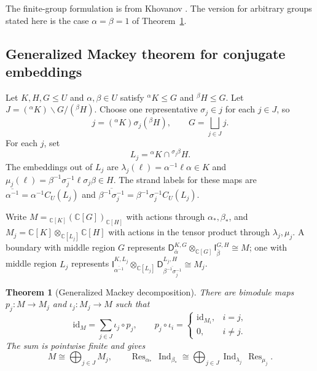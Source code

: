 \documentclass[11pt,a4paper]{article}
\numberwithin{equation}{section}
\newtheorem{theorem}{Theorem}[section]
\theoremstyle{definition}
\newcommand{\C}{\mathbb C}
\newcommand{\id}{\mathrm{id}}
\newcommand{\Ind}{\operatorname{Ind}}
\newcommand{\Res}{\operatorname{Res}}
\newcommand{\cg}[2]{{}^{#1}\!#2}
\newcommand{\I}{\mathsf I}
\newcommand{\D}{\mathsf D}
\begin{document}
The finite-group formulation is from Khovanov
\cite[Eq.~(29) and Prop.~6]{khovanov}. The version for arbitrary groups
stated here is the case \(\alpha=\beta=1\) of Theorem~\ref{thm:mackey}.

\subsection{Generalized Mackey theorem for conjugate embeddings}
\label{sec:generalized}

Let \(K,H,G\le U\) and \(\alpha,\beta\in U\) satisfy
\(\cg{\alpha}{K}\le G\) and \(\cg{\beta}{H}\le G\).
Let \(J=(\cg{\alpha}{K})\backslash G/(\cg{\beta}{H})\). Choose one
representative \(\sigma_j\in j\) for each \(j\in J\), so
\begin{equation}\label{eq:conj-cosets}
 j=(\cg{\alpha}{K})\sigma_j(\cg{\beta}{H}),
 \qquad G=\bigsqcup_{j\in J}j.
\end{equation}
For each \(j\), set
\begin{equation}\label{eq:alt-L}
 L_j=\cg{\alpha}{K}\cap\cg{\sigma_j\beta}{H} .
\end{equation}
The embeddings out of \(L_j\) are
\(\lambda_j(\ell)=\alpha^{-1}\ell\alpha\in K\) and
\(\mu_j(\ell)=\beta^{-1}\sigma_j^{-1}\ell\sigma_j\beta\in H\).
The strand labels for these maps are
\(\overline{\alpha^{-1}}=\alpha^{-1}C_U(L_j)\) and
\(\overline{\beta^{-1}\sigma_j^{-1}}=\beta^{-1}\sigma_j^{-1}C_U(L_j)\).

Write \(M={}_{\C[K]}(\C[G])_{\C[H]}\) with actions through \(\alpha_*,\beta_*\),
and \(M_j=\C[K]\otimes_{\C[L_j]}\C[H]\) with actions in the tensor product
through \(\lambda_j,\mu_j\). A boundary with middle region \(G\)
represents \(\D_{\bar\alpha}^{K,G}\otimes_{\C[G]}\I_{\bar\beta}^{G,H}\cong M\);
one with middle region \(L_j\) represents
\(\I_{\overline{\alpha^{-1}}}^{K,L_j}\otimes_{\C[L_j]}
 \D_{\overline{\beta^{-1}\sigma_j^{-1}}}^{L_j,H}\cong M_j\).

\begin{theorem}[Generalized Mackey decomposition]\label{thm:mackey}
There are bimodule maps \(p_j:M\to M_j\) and \(\iota_j:M_j\to M\) such that
\begin{equation}\label{eq:split}
   \id_M=\sum_{j\in J}\iota_j\circ p_j,\qquad
   p_j\circ\iota_i=
   \begin{cases}
     \id_{M_i},&i=j,\\
     0,&i\ne j.
   \end{cases}
\end{equation}
The sum is pointwise finite and gives
\[
 M\cong\bigoplus_{j\in J}M_j,\qquad
 \Res_{\alpha_*}\,\Ind_{\beta_*}
   \cong\bigoplus_{j\in J}\Ind_{\lambda_j}\,\Res_{\mu_j}.
\]
\end{theorem}
\end{document}
